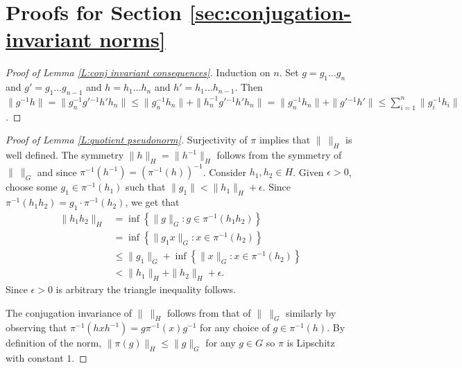 \documentclass[12pt]{amsart}
\theoremstyle{definition}
\begin{document}
\appendix

\section{Proofs for Section \ref{sec:conjugation-invariant norms}}\label{app:cin proofs}

\begin{proof}[Proof of Lemma \ref{L:conj invariant consequences}]
Induction on $n$.
Set $g=g_1\dots g_{n}$ and $g'=g_1\dots g_{n-1}$ and $h=h_1\dots h_{n}$ and $h'=h_1\dots h_{n-1}$.
Then $\| g^{-1}h\| = \|g_n^{-1} g'{}^{-1} h' h_n\| \leq \|g_n^{-1} h_n\| + \|h_n^{-1} g'{}^{-1} h' h_n\| = \|g_n^{-1} h_n\| + \| g'{}^{-1} h' \| \leq \sum_{i=1}^n \|g_i^{-1} h_i\|$.
\end{proof}


\begin{proof}[Proof of Lemma \ref{L:quotient pseudonorm}]
Surjectivity of $\pi$ implies that $\| \ \|_H$ is well defined.
The symmetry $\|h\|_H=\|h^{-1}\|_H$ follows from the symmetry of $\| \ \|_G$ and since $\pi^{-1}(h^{-1})=(\pi^{-1}(h))^{-1}$.
Consider $h_1,h_2 \in H$.
Given $\epsilon>0$, choose some $g_1 \in \pi^{-1}(h_1)$ such that $\|g_1\| < \|h_1\|_H +\epsilon$.
Since $\pi^{-1}(h_1h_2) = g_1 \cdot \pi^{-1}(h_2)$, we get that 
\begin{align*}
\| h_1 h_2\|_{H} &= 
\inf \left\{ \|g\|_G : g \in \pi^{-1}(h_1h_2)\right\}\\
&=
\inf \left\{ \| g_1 x\|_G :  x \in \pi^{-1}(h_2)\right\} \\
&\leq
\|g_1\|_G + \inf \left\{ \| x\|_G :  x \in \pi^{-1}(h_2)\right\} \\
&<
\|h_1\|_H + \|h_2\|_H + \epsilon.
\end{align*}
Since $\epsilon>0$ is arbitrary the triangle inequality follows.

The conjugation invariance of $\| \ \|_H$ follows from that of $\| \ \|_G$ similarly by observing that $\pi^{-1}(hxh^{-1})=g \pi^{-1}(x) g^{-1}$ for any choice of $g \in \pi^{-1}(h)$.
By definition of the norm, $\| \pi(g)\|_H \leq \| g\|_G$ for any $g \in G$ so $\pi$ is Lipschitz with constant $1$.
\end{proof}
\end{document}
